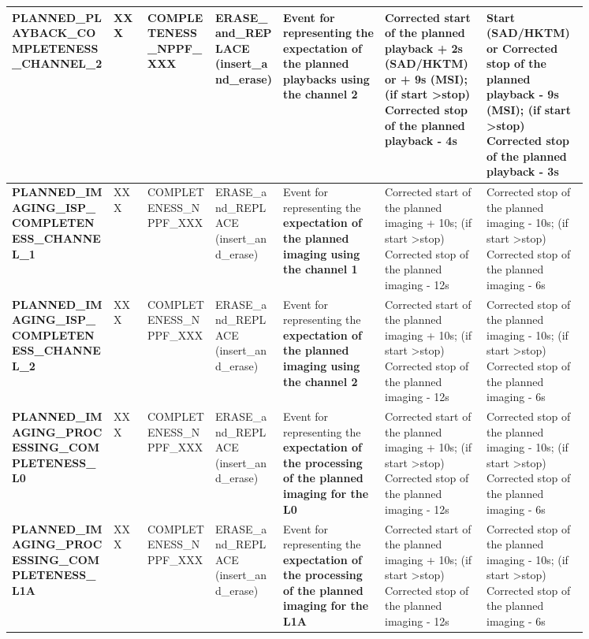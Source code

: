 \begin{landscape}
\begin{longtable}{|M{0.15\linewidth}|M{0.05\linewidth}|M{0.10\linewidth}|M{0.10\linewidth}|M{0.15\linewidth}|M{0.15\linewidth}|M{0.15\linewidth}|}
\textbf{PLANNED\_PLAYBACK\_COMPLETENESS\_CHANNEL\_2} & XXX & \- COMPLETENESS\_NPPF\_XXX & ERASE\_and\_REPLACE (insert\_and\_erase) & Event for representing the \textbf{expectation of the planned playbacks using the channel 2} & Corrected start of the planned playback + 2s (SAD/HKTM) or + 9s (MSI); (if start \textgreater  stop) Corrected stop of the planned playback - 4s & Start (SAD/HKTM) or Corrected stop of the planned playback - 9s (MSI); (if start \textgreater  stop) Corrected stop of the planned playback - 3s \\ \hline
\textbf{PLANNED\_IMAGING\_ISP\_COMPLETENESS\_CHANNEL\_1} & XXX & \- COMPLETENESS\_NPPF\_XXX & ERASE\_and\_REPLACE (insert\_and\_erase) & Event for representing the \textbf{expectation of the planned imaging using the channel 1} & Corrected start of the planned imaging + 10s; (if start \textgreater  stop) Corrected stop of the planned imaging - 12s & Corrected stop of the planned imaging - 10s; (if start \textgreater  stop) Corrected stop of the planned imaging - 6s \\ \hline
\textbf{PLANNED\_IMAGING\_ISP\_COMPLETENESS\_CHANNEL\_2} & XXX & \- COMPLETENESS\_NPPF\_XXX & ERASE\_and\_REPLACE (insert\_and\_erase) & Event for representing the \textbf{expectation of the planned imaging using the channel 2} & Corrected start of the planned imaging + 10s; (if start \textgreater  stop) Corrected stop of the planned imaging - 12s & Corrected stop of the planned imaging - 10s; (if start \textgreater  stop) Corrected stop of the planned imaging - 6s \\ \hline
\textbf{PLANNED\_IMAGING\_PROCESSING\_COMPLETENESS\_L0} & XXX & \- COMPLETENESS\_NPPF\_XXX & ERASE\_and\_REPLACE (insert\_and\_erase) & Event for representing the \textbf{expectation of the processing of the planned imaging for the L0} & Corrected start of the planned imaging + 10s; (if start \textgreater  stop) Corrected stop of the planned imaging - 12s & Corrected stop of the planned imaging - 10s; (if start \textgreater  stop) Corrected stop of the planned imaging - 6s \\ \hline
\textbf{PLANNED\_IMAGING\_PROCESSING\_COMPLETENESS\_L1A} & XXX & \- COMPLETENESS\_NPPF\_XXX & ERASE\_and\_REPLACE (insert\_and\_erase) & Event for representing the \textbf{expectation of the processing of the planned imaging for the L1A} & Corrected start of the planned imaging + 10s; (if start \textgreater  stop) Corrected stop of the planned imaging - 12s & Corrected stop of the planned imaging - 10s; (if start \textgreater  stop) Corrected stop of the planned imaging - 6s \\ \hline

\end{longtable}
\end{landscape}
